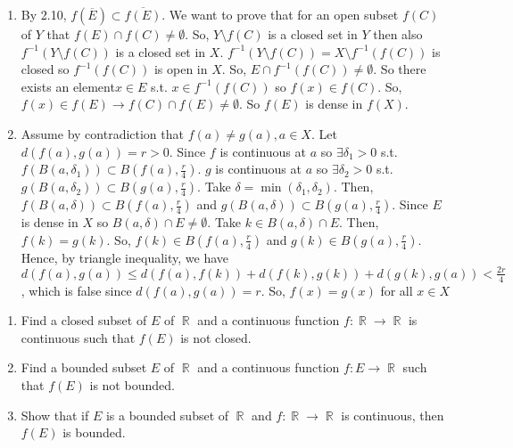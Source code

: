 \documentclass[12pt,letterpaper,boxed]{hmcpset}
\DeclareMathOperator{\R}{\mathbb{R}}
\begin{document}
\begin{solution}
\begin{enumerate}
     \itemsep0em
    \item By 2.10, $f(\overline{E})\subset\overline{f(E)}$. We want to prove that for an open subset $f(C)$ of $Y$ that $f(E) \cap f(C)\neq \emptyset$. So, $Y\setminus f(C)$ is a closed set in $Y$ then also $f^{-1}(Y\setminus f(C))$ is a closed set in $X$. $f^{-1}(Y\setminus f(C))=X\setminus f^{-1}(f(C))$ is closed so $f^{-1}(f(C))$ is open in $X$. So, $E\cap f^{-1}(f(C))\neq \emptyset.$ So there exists an element$x\in E$ s.t. $x \in f^{-1}(f(C))$ so $f(x) \in f(C).$ So, $f(x) \in f(E) \rightarrow f(C)\cap f(E)\neq \emptyset$. So $f(E)$ is dense in $f(X).$
    \item Assume by contradiction that $f(a)\neq g(a), a\in X$. Let $d(f(a), g(a)) = r > 0$. Since $f$ is continuous at $a$ so $\exists \delta_1 > 0$ s.t. $f(B(a, \delta_1))\subset B(f(a),\frac{r}{4})$. $g$ is continuous at $a$ so $\exists \delta_2 > 0$ s.t. $g(B(a, \delta_2))\subset B(g(a),\frac{r}{4})$. Take $\delta = \min(\delta_1, \delta_2)$. Then, $f(B(a, \delta))\subset B(f(a),\frac{r}{4})$ and $g(B(a, \delta))\subset B(g(a),\frac{r}{4})$. Since $E$ is dense in $X$ so $B(a, \delta)\cap E \neq \emptyset$. Take $k\in B(a, \delta)\cap E$. Then, $f(k)=g(k).$ So, $f(k)\in B(f(a), \frac{r}{4})$ and $g(k)\in B(g(a), \frac{r}{4})$. Hence, by triangle inequality, we have $d(f(a), g(a)) \leq d(f(a), f(k)) + d(f(k), g(k)) + d(g(k), g(a)) < \frac{2r}{4}$, which is false since $d(f(a), g(a))=r.$ So, $f(x)=g(x)$ for all $x\in X$
\end{enumerate}
\end{solution}

\begin{problem}[Exercise 2.23]
\begin{enumerate}
    \itemsep0em
    \item Find a closed subset of $E$ of $\R$ and a continuous function $f: \R \rightarrow \R$ is continuous such that $f(E)$ is not closed.
    \item Find a bounded subset $E$ of $\R$ and a continuous function $f : E \rightarrow \R$ such that $f(E)$ is not bounded.
    \item Show that if $E$ is a bounded subset of $\R$ and $f: \R \rightarrow \R$ is continuous, then $f(E)$ is bounded.
\end{enumerate} 
\end{problem}
\end{document}
